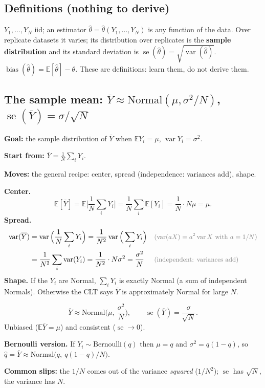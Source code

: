\documentclass[11pt]{article}
\newcommand{\E}{\mathbb{E}}
\newcommand{\Var}{\operatorname{var}}
\newcommand{\se}{\operatorname{se}}
\newcommand{\bias}{\operatorname{bias}}
\newcommand{\Bern}{\text{Bernoulli}}
\newcommand{\Norm}{\text{Normal}}
\newcommand{\Ybar}{\overline{Y}}
\newcommand{\why}[1]{&&\text{\small\color{gray}(#1)}}
\newcommand{\mv}[1]{\tcbox[on line, colback=methodclr, colframe=methodclr, coltext=white, boxsep=0pt,
  left=2pt, right=2pt, top=1pt, bottom=1pt, arc=1.5pt]{\sffamily\scriptsize\bfseries M#1}}
\newcommand{\goal}[1]{\textbf{Goal:} #1\par}
\newcommand{\start}[1]{\textbf{Start from:} #1\par}
\newcommand{\moves}[1]{\textbf{Moves:} #1\par}
\begin{document}
\subsection{Definitions (nothing to derive)}
$Y_1,\dots,Y_N$ iid; an estimator $\hat\theta=\hat\theta(Y_1,\dots,Y_N)$ is any function of the data. Over replicate datasets it varies; its
distribution over replicates is the \textbf{sample distribution} and its standard deviation is $\se(\hat\theta)=\sqrt{\Var(\hat\theta)}$.
$\bias(\hat\theta)=\E[\hat\theta]-\theta$. These are definitions: learn them, do not derive them.

\subsection{The sample mean: $\Ybar\approx\Norm(\mu,\sigma^2/N)$, $\se(\Ybar)=\sigma/\sqrt N$}\label{sec:ybar}
\begin{methodbox}
\goal{the sample distribution of $\Ybar$ when $\E Y_i=\mu$, $\Var Y_i=\sigma^2$.}
\start{$\Ybar=\frac1N\sum_iY_i$.}
\moves{the general recipe: \mv{2} center, \mv{4} spread (independence: variances add), \mv{7} shape.}
\end{methodbox}
\textbf{Center.}
\[
\E[\Ybar]=\E\Big[\frac1N\sum_iY_i\Big]=\frac1N\sum_i\E[Y_i]=\frac1N\cdot N\mu=\mu .
\]
\textbf{Spread.}
\begin{align*}
\Var(\Ybar)&=\Var\Big(\frac1N\sum_iY_i\Big)=\frac{1}{N^2}\Var\Big(\sum_iY_i\Big) \why{$\Var(aX)=a^2\Var X$ with $a=1/N$}\\
&=\frac{1}{N^2}\sum_i\Var(Y_i)=\frac{1}{N^2}\cdot N\sigma^2=\frac{\sigma^2}{N} \why{independent: variances add}
\end{align*}
\textbf{Shape.} If the $Y_i$ are Normal, $\sum_iY_i$ is exactly Normal (a sum of independent Normals). Otherwise the CLT says
$\Ybar$ is approximately Normal for large $N$.
\begin{keybox}
\[\Ybar\approx\Norm\Big(\mu,\ \frac{\sigma^2}{N}\Big),\qquad\se(\Ybar)=\frac{\sigma}{\sqrt N}.\]
Unbiased ($\E\Ybar=\mu$) and consistent ($\se\to0$).
\end{keybox}
\textbf{Bernoulli version.} If $Y_i\sim\Bern(q)$ then $\mu=q$ and $\sigma^2=q(1-q)$, so $\hat q=\Ybar\approx\Norm\big(q,\ q(1-q)/N\big)$.

\textbf{Common slips:} the $1/N$ comes out of the variance \emph{squared} ($1/N^2$); $\se$ has $\sqrt N$, the variance has $N$.
\end{document}
